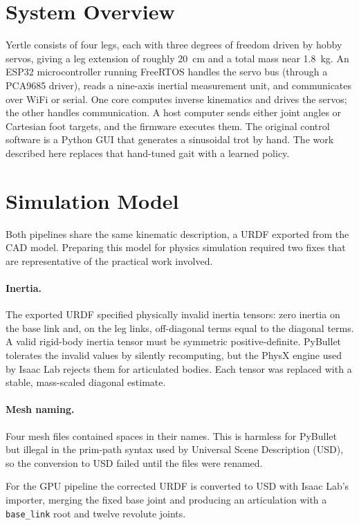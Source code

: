 \documentclass[11pt]{article}
\begin{document}
\section{System Overview}
Yertle consists of four legs, each with three degrees of freedom driven by hobby
servos, giving a leg extension of roughly \SI{20}{\centi\meter} and a total mass
near \SI{1.8}{\kilogram}. An ESP32 microcontroller running FreeRTOS handles the
servo bus (through a PCA9685 driver), reads a nine-axis inertial measurement
unit, and communicates over WiFi or serial. One core computes inverse kinematics
and drives the servos; the other handles communication. A host computer sends
either joint angles or Cartesian foot targets, and the firmware executes them.
The original control software is a Python GUI that generates a sinusoidal trot by
hand. The work described here replaces that hand-tuned gait with a learned policy.

\section{Simulation Model}
Both pipelines share the same kinematic description, a URDF exported from the CAD
model. Preparing this model for physics simulation required two fixes that are
representative of the practical work involved.

\paragraph{Inertia.} The exported URDF specified physically invalid inertia
tensors: zero inertia on the base link and, on the leg links, off-diagonal terms
equal to the diagonal terms. A valid rigid-body inertia tensor must be symmetric
positive-definite. PyBullet tolerates the invalid values by silently
recomputing, but the PhysX engine used by Isaac Lab rejects them for articulated
bodies. Each tensor was replaced with a stable, mass-scaled diagonal estimate.

\paragraph{Mesh naming.} Four mesh files contained spaces in their names. This is
harmless for PyBullet but illegal in the prim-path syntax used by Universal Scene
Description (USD), so the conversion to USD failed until the files were renamed.

For the GPU pipeline the corrected URDF is converted to USD with Isaac Lab's
importer, merging the fixed base joint and producing an articulation with a
\texttt{base\_link} root and twelve revolute joints.
\end{document}
